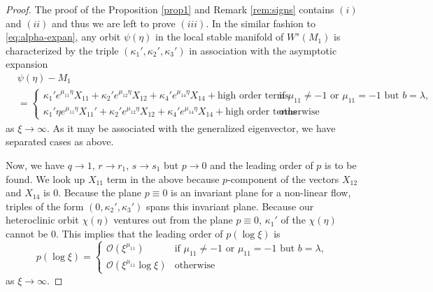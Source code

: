 \documentclass[a4paper,11pt]{article}
\def\BO{{\mathcal{O}}}
\theoremstyle{remark}
\begin{document}
\begin{proof}
The proof of the Proposition \ref{prop1} and Remark \ref{rem:signs} contains $(i)$ and $(ii)$ and thus we are left to prove $(iii)$. In the similar fashion to \eqref{eq:alpha-expan}, any orbit $\psi(\eta)$ in the local stable manifold of $W^s(M_1)$ is characterized by the triple $(\kappa_1',\kappa_2',\kappa_3')$ in association with the asymptotic expansion
\begin{equation}
\begin{aligned}
 &\psi(\eta) -M_1\\
 &= \begin{cases} \kappa_1'e^{\mu_{11}\eta}X_{11} + \kappa_2'e^{\mu_{12}\eta}X_{12} + \kappa_4'e^{\mu_{14}\eta}X_{14} + \text{high order terms} & \text{if $\mu_{11}\ne-1$ or $\mu_{11}=-1$ but $b=\lambda$,}\\
 \kappa_1'\eta e^{\mu_{11}\eta}X_{11}' + \kappa_2'e^{\mu_{12}\eta}X_{12} + \kappa_4'e^{\mu_{14}\eta}X_{14} + \text{high order terms} & \text{otherwise }
 \end{cases}
\end{aligned}
\end{equation}
as $\xi \rightarrow \infty$. As it may be associated with the generalized eigenvector, we have separated cases as above.

Now, we have $q \rightarrow 1$, $r \rightarrow r_1$, $s \rightarrow s_1$ but $p \rightarrow 0$ and the leading order of $p$ is to be found. We look up  $X_{11}$ term in the above because $p$-component of the vectors $X_{12}$ and $X_{14}$ is $0$. Because the plane $p\equiv0$ is an invariant plane for a non-linear flow, triples of the form $(0,\kappa_2',\kappa_3')$ spans this invariant plane. Because our heteroclinic orbit $\chi(\eta)$ ventures out from the plane $p\equiv0$, $\kappa_1'$ of the $\chi(\eta)$ cannot be $0$.
This implies that the leading order of $p(\log\xi)$ is
$$p(\log\xi) = \begin{cases} \BO(\xi^{\mu_{11}}) & \text{if $\mu_{11}\ne-1$ or $\mu_{11}=-1$ but $b=\lambda$,}\\
 \BO(\xi^{\mu_{11}}\log\xi) & \text{otherwise}
 \end{cases}
 $$
as $\xi \rightarrow \infty$.


\end{proof}
\end{document}

